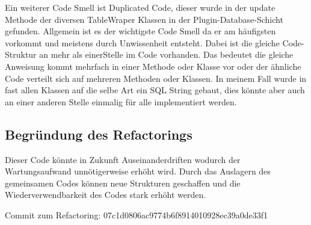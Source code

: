 Ein weiterer Code Smell ist Duplicated Code, dieser wurde in der update Methode der diversen TableWraper Klassen in der Plugin-Database-Schicht gefunden.
Allgemein ist es der wichtigste Code Smell da er am häufigsten vorkommt und meistens durch Unwissenheit entsteht.
Dabei ist die gleiche Code-Struktur an mehr als einerStelle im Code vorhanden.
Das bedeutet die gleiche Anweisung kommt mehrfach in einer Methode oder Klasse vor oder der ähnliche Code verteilt sich auf mehreren Methoden oder Klassen.
In meinem Fall wurde in fast allen Klassen auf die selbe Art ein SQL String gebaut, dies könnte aber auch an einer anderen Stelle einmalig für alle implementiert werden.

\subsection{Begründung des Refactorings}

Dieser Code könnte in Zukunft Auseinanderdriften wodurch der Wartungsaufwand unnötigerweise erhöht wird.
Durch das Auslagern des gemeinsamen Codes können neue Strukturen geschaffen und die Wiederverwendbarkeit des Codes stark erhöht werden.


Commit zum Refactoring: 07c1d0806ac9774b6f8914010928ec39a0de33f1


